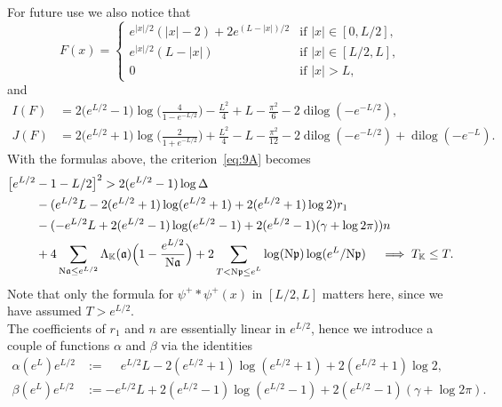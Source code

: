 \documentclass[a4paper,11pt]{amsart}
\newcommand{\field}[1]{\mathbb{{#1}}}
\newcommand{\ideal}[1]{\mathfrak{{#1}}}
\newcommand{\K}{\field{{K}}}
\newcommand{\p}{\ideal{p}}
\renewcommand{\a}{\ideal{a}}
\newcommand{\Norm}{\textrm{\upshape N}}
\DeclareMathOperator{\dilog}{dilog}
\theoremstyle{remark}
\begin{document}
%
For future use we also notice that
\begin{equation}\label{eq:10A}
F(x)
 = \begin{cases}
        e^{|x|/2}(|x|-2) + 2e^{(L-|x|)/2} & \text{if $|x|\in[0,L/2]$},\\
        e^{|x|/2}(L-|x|)                  & \text{if $|x|\in[L/2,L]$},\\
        0                                 & \text{if $|x| > L$},
       \end{cases}
\end{equation}
and
%
\begin{subequations}
\begin{align}
I(F)
  &= 2\big(e^{L/2}-1\big)\log\Big(\frac{4}{1-e^{-L/2}}\Big) - \frac{L^2}{4} + L
   - \frac{\pi^2}{6} - 2\dilog(-e^{-L/2}),                                      \label{eq:11aA}\\
J(F)
  &= 2\big(e^{L/2}+1\big)\log\Big(\frac{2}{1+e^{-L/2}}\Big) + \frac{L^2}{4} - L
   - \frac{\pi^2}{12} - 2\dilog(-e^{-L/2}) + \dilog(-e^{-L}).                   \label{eq:11bA}
\end{align}
\end{subequations}
%
%
With the formulas above, the criterion~\eqref{eq:9A} becomes
\begin{align}
\big[e^{L/2} &- 1 - L/2\big]^2
>  2(e^{L/2}-1)\log \Delta                                                             \notag \\
&  - (e^{L/2} L - 2(e^{L/2}+1)\log(e^{L/2}+1) + 2(e^{L/2}+1)\log 2) r_1                \notag \\
&  - (- e^{L/2} L + 2(e^{L/2}-1)\log(e^{L/2}-1) + 2(e^{L/2}-1)(\gamma+\log 2\pi)) n    \notag \\
&  + 4\sum_{\Norm\a\leq e^{L/2}} \Lambda_{\K}(\a)\Big(1 - \frac{e^{L/2}}{\Norm\a}\Big)
   + 2\sum_{\substack{T< \Norm\p \leq e^L}} \log(\Norm\p)\log(e^L/\Norm\p)
\quad
\implies T_\K \leq T.                                                                  \label{eq:12A}
\end{align}
Note that only the formula for $\psi^+\ast\psi^+(x)$ in $[L/2,L]$ matters here, since we have assumed
$T > e^{L/2}$. \\
The coefficients of $r_1$ and $n$ are essentially linear in $e^{L/2}$, hence we introduce a couple of
functions $\alpha$ and $\beta$ via the identities
\begin{align*}
 \alpha(e^L)e^{L/2} &:= \phantom{-} e^{L/2} L - 2(e^{L/2}+1)\log(e^{L/2}+1) + 2(e^{L/2}+1)\log 2            ,\\
  \beta(e^L)e^{L/2} &:=           - e^{L/2} L + 2(e^{L/2}-1)\log(e^{L/2}-1) + 2(e^{L/2}-1)(\gamma+\log 2\pi).
\end{align*}
\end{document}
